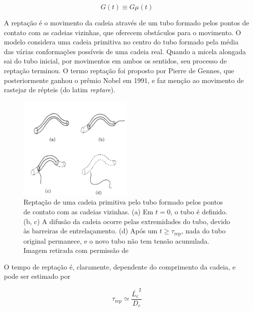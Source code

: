 		\begin{equation}
			G(t) \equiv G \mu(t)	
			\label{eqn:decaimento_G_t}
		\end{equation} %
		
		A reptação é o movimento da cadeia através de um tubo formado pelos pontos de contato com as cadeias vizinhas, que oferecem obstáculos para o movimento. O modelo considera uma cadeia primitiva no centro do tubo formado pela média das várias conformações possíveis de uma cadeia real. \cite{Goodwin2008} Quando a micela alongada sai do tubo inicial, por movimentos em ambos os sentidos, seu processo de reptação terminou. O termo reptação foi proposto por Pierre de Gennes\cite{DeGennes1971, Gennes1983}, 
		que posteriormente ganhou o prêmio Nobel em 1991\cite{DeGennesNobel}, e faz menção ao movimento de rastejar de répteis (do latim \emph{reptare}). \cite{Goodwin2008}

		\begin{figure}[h]
			\centering
			\includegraphics[width=0.5\textwidth]{imagens/artigos/reptacao_cates_1987}
			\caption{Reptação de uma cadeia primitiva pelo tubo formado pelos pontos de contato com as cadeias vizinhas. (a) Em \(t=0\), o tubo é definido. (b, c) A difusão da cadeia ocorre pelas extremidades do tubo, devido às barreiras de entrelaçamento. (d) Após um \(t \ge \tau_\mathrm{rep}\), nada do tubo original permanece, e o novo tubo não tem tensão acumulada. Imagem retirada com permissão de \citeauthor{Cates1987}}
			\label{fig:reptacao_cates1987}
		\end{figure}
		
		O tempo de reptação é, claramente, dependente do comprimento da cadeia, e pode ser estimado por\cite{Cates1990}
		
		\begin{equation}
			\tau_\mathrm{rep} \simeq \frac{\overline{L_c}^2}{D_c}
			\label{eqn:tau_rep_comprimento_contorno}
		\end{equation} %
		
